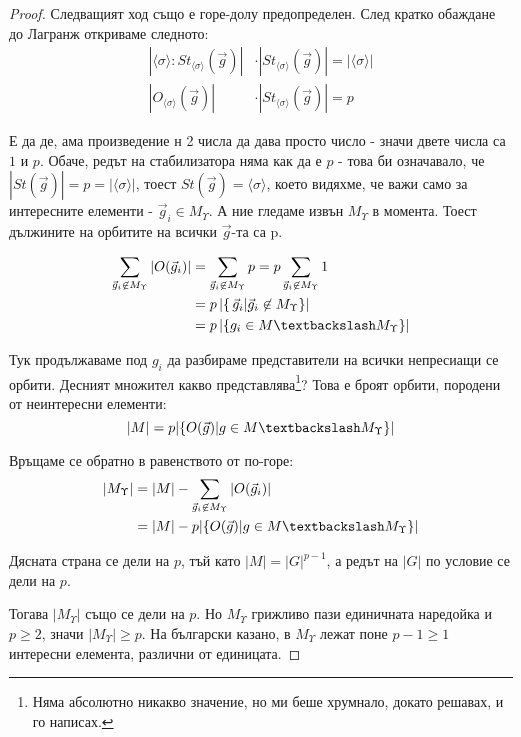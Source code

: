 \documentclass{article}
\theoremstyle{definition}
\newcommand{\grsigma}[0]{{\langle \sigma \rangle}}
\begin{document}
\begin{proof}
    Следващият ход също е горе-долу предопределен. След кратко обаждане до Лагранж откриваме следното:
    \begin{align*}
        |\grsigma:St_{\grsigma}(\vec g)| &\cdot |St_{\grsigma}(\vec g)| = |\grsigma|\\
        |O_\grsigma(\vec g)| &\cdot |St_{\grsigma}(\vec g)| = p
    \end{align*}

    Е да де, ама произведение н 2 числа да дава просто число - значи двете числа са $1$ и $p$.
    Обаче, редът на стабилизатора няма как да е $p$ - това би означавало, че $|St(\vec g)| = p = |\grsigma|$, тоест $St(\vec g) = \grsigma$, което видяхме, че важи само за интересните елементи - ${\vec g_i \in M_\Upsilon}$.
    А ние гледаме извън $M_\Upsilon$ в момента.
    Тоест дължините на орбитите на всички $\vec g$-та са p.

    \begin{align*}
        \sum_\gunint |O(\vec g_i)| &= \sum_\gunint p = p \sum_\gunint 1\\
        &= p \, |\{\,\vec g_i | \gunint \}|\\
        &= p \, |\{g_i \in M \textbackslash M_\Upsilon\}|
    \end{align*}

    Тук продължаваме под $g_i$ да разбираме представители на всички непресиащи се орбити.
    Десният множител какво представлява\footnote{Няма абсолютно никакво значение, но ми беше хрумнало, докато решавах, и го написах.}? Това е броят орбити, породени от неинтересни елементи:
    $$|M| = p | \{ O(\vec g) | g \in M \textbackslash M_\Upsilon \}| $$
    \hrulefill

    Връщаме се обратно в равенството от по-горе:
    \begin{align*}
        |M_\Upsilon| &= |M| - \sum_{\gunint} |O(\vec g_i)|\\
        &= |M| - p | \{ O(\vec g) | g \in M \textbackslash M_\Upsilon \}|
    \end{align*}

    Дясната страна се дели на $p$, тъй като $|M| = |G|^{p-1}$, а редът на $|G|$ по условие се дели на $p$.

    Тогава $|M_\Upsilon|$ също се дели на $p$. Но $M_\Upsilon$ грижливо пази единичната наредойка и $p \ge 2$, значи $|M_\Upsilon| \ge p$.
    На български казано, в $M_\Upsilon$ лежат поне $p-1 \ge 1$ интересни елемента, различни от единицата.
\end{proof}

\end{document}
